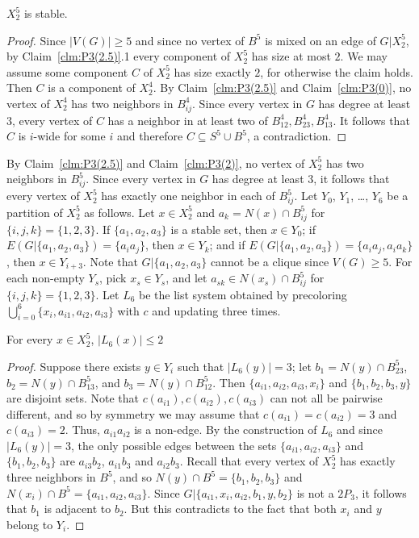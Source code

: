 \documentclass[11pt]{article}
\begin{document}
\begin{claim}\label{clm:P3(3)}
$ X^5_2 $ is stable.
\end{claim}
\begin{proof}
Since $|V(G)|\geq 5$ and since no vertex of $B^5$ is mixed on an edge of $G|X^5_2$, by Claim~\ref{clm:P3(2.5)}.1 every component of $ X^5_2 $ has size at most $2$. We may assume some component $C$ of $X^5_2$ has size exactly $2$, for otherwise the claim holds. Then $C$ is a component of $ X^4_2 $. By Claim~\ref{clm:P3(2.5)} and Claim~\ref{clm:P3(0)}, no vertex of $X_2^4$ has two neighbors in $B^4_{ij}$. Since every vertex in $G$ has degree at least $3$, every vertex of $C$ has a neighbor in at least two of $ B^4_{12},B^4_{23},B^4_{13}$. It follows that 
$C$ is $ i $-wide for some $ i $ and therefore $C\subseteq S^5\cup B^5$, a contradiction.
\end{proof}


By Claim~\ref{clm:P3(2.5)} and Claim~\ref{clm:P3(2)}, no vertex of $X_2^5$ has two neighbors in $B^5_{ij}$. Since every vertex in $G$ has degree at least $3$, it  follows that every vertex  of $X_2^5$ has exactly one neighbor in each of $ B^5_{ij} $.
Let $ Y_0 $, $ Y_1 $, \ldots, $ Y_6 $ be a partition of $ X^5_2 $ as follows. Let $x\in X_2^5$ and $ a_k= N(x)\cap B^5_{ij} $ for $\{i,j,k\}=\{1,2,3\}$. If $\{a_1,a_2,a_3\}$ is a stable set, then $ x\in Y_0 $; if $E(G|\{a_1,a_2,a_3\})=\{a_ia_j\}$, then $x\in Y_k$; and if $E(G|\{a_1,a_2,a_3\})=\{a_ia_j, a_ia_k\}$, then $x\in Y_{i+3}$. Note that $ G|\{a_1,a_2,a_3\} $ cannot be a clique since $V(G)\geq 5$.
For each non-empty $ Y_s $, pick $ x_s \in Y_s $, and let $ a_{sk}\in N(x_s)\cap B^5_{ij} $ for $\{i,j,k\}=\{1,2,3\}$.
Let $L_6$ be the list system obtained by precoloring $ \bigcup\limits_{i=0}^{6}\{x_i,a_{i1},a_{i2},a_{i3}\} $ with $c$ and updating three times. 

\begin{claim}\label{clm:P3(4)}
For every $x\in X^5_2$,	$|L_6(x)|\leq 2$
\end{claim}
\begin{proof}
Suppose there exists $ y \in Y_i $ such that $|L_6(y)|=3$; let $ b_1=N(y)\cap B^5_{23}$, $b_2=N(y)\cap B^5_{13}$, and $b_3=N(y)\cap B^5_{12} $. Then $ \{a_{i1},a_{i2},a_{i3},x_i\} $ and $ \{b_1,b_2,b_3,y\} $ are disjoint sets.
Note that $ c(a_{i1}), c(a_{i2}), c(a_{i3})$ can not all be pairwise different, and so by symmetry we may assume that $ c(a_{i1})=c(a_{i2})=3 $ and $ c(a_{i3})=2 $. 
Thus, $a_{i1}a_{i2}$ is a non-edge.
By the construction of $L_6$ and since $|L_6(y)|=3$, the only possible edges
between the sets $ \{a_{i1},a_{i2},a_{i3}\} $ and $ \{b_1,b_2,b_3\} $ are $ a_{i3}b_2 $, $ a_{i1}b_3 $ and $ a_{i2}b_3 $. Recall that every vertex of $X_2^5$ has exactly three neighbors in $B^5$, and so $ N(y)\cap B^5= \{b_1,b_2,b_3\} $ and $ N(x_i)\cap B^5= \{a_{i1},a_{i2},a_{i3}\} $. Since $ G|\{a_{i1},x_i,a_{i2},b_1,y,b_2\} $ is not a $ 2P_3$, it follows that $ b_1 $ is adjacent to $ b_2 $.
But this contradicts to the fact that both $ x_i $ and $ y $ belong to $ Y_i $.  
\end{proof} 
\end{document}

